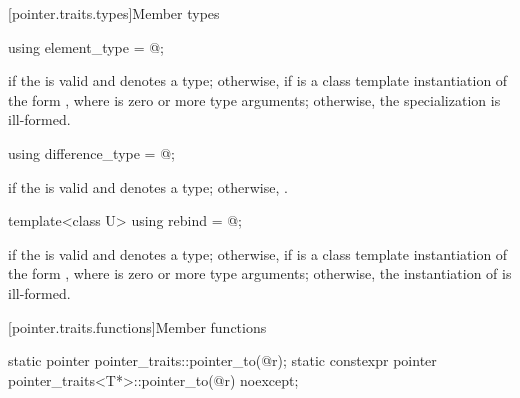 [pointer.traits.types]{Member types}

%
\begin{itemdecl}
using element_type = @\seebelow@;
\end{itemdecl}

\begin{itemdescr}
\pnum
\ctype {} if
the   is valid and denotes a
type; otherwise,  if
 is a class template instantiation of the form ,
where  is zero or more type arguments; otherwise, the specialization is
ill-formed.
\end{itemdescr}

%
\begin{itemdecl}
using difference_type = @\seebelow@;
\end{itemdecl}

\begin{itemdescr}
\pnum
\ctype {} if
the   is valid and denotes a
type; otherwise,
.
\end{itemdescr}

%
\begin{itemdecl}
template<class U> using rebind = @\seebelow@;
\end{itemdecl}

\begin{itemdescr}
\pnum
\templalias {} if
the   is valid and denotes a
type; otherwise,
 if
 is a class template instantiation of the form ,
where  is zero or more type arguments; otherwise, the instantiation of
 is ill-formed.
\end{itemdescr}

[pointer.traits.functions]{Member functions}

%
\begin{itemdecl}
static pointer pointer_traits::pointer_to(@\seebelow@ r);
static constexpr pointer pointer_traits<T*>::pointer_to(@\seebelow@ r) noexcept;
\end{itemdecl}


